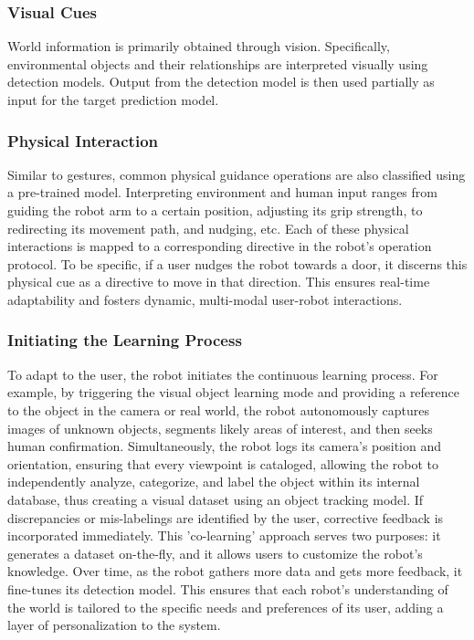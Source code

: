\documentclass[conference]{IEEEtran}
\begin{document}
\subsubsection{Visual Cues}

World information is primarily obtained through vision. Specifically, environmental objects and their relationships are interpreted visually using detection models. Output from the detection model is then used partially as input for the target prediction model.

\subsubsection{Physical Interaction}

Similar to gestures, common physical guidance operations are also classified using a pre-trained model. Interpreting environment and human input ranges from guiding the robot arm to a certain position, adjusting its grip strength, to redirecting its movement path, and nudging, etc. Each of these physical interactions is mapped to a corresponding directive in the robot's operation protocol. To be specific, if a user nudges the robot towards a door, it discerns this physical cue as a directive to move in that direction. This ensures real-time adaptability and fosters dynamic, multi-modal user-robot interactions.

\subsubsection{Initiating the Learning Process}

To adapt to the user, the robot initiates the continuous learning process. For example, by triggering the visual object learning mode and providing a reference to the object in the camera or real world, the robot autonomously captures images of unknown objects, segments likely areas of interest, and then seeks human confirmation. Simultaneously, the robot logs its camera's position and orientation, ensuring that every viewpoint is cataloged, allowing the robot to independently analyze, categorize, and label the object within its internal database, thus creating a visual dataset using an object tracking model. If discrepancies or mis-labelings are identified by the user, corrective feedback is incorporated immediately. This 'co-learning' approach serves two purposes: it generates a dataset on-the-fly, and it allows users to customize the robot's knowledge. Over time, as the robot gathers more data and gets more feedback, it fine-tunes its detection model. This ensures that each robot's understanding of the world is tailored to the specific needs and preferences of its user, adding a layer of personalization to the system.
\end{document}
